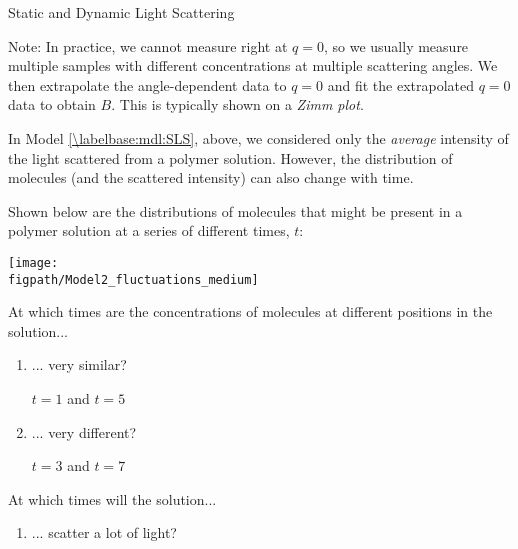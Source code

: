 \begin{activity}{Static and Dynamic Light Scattering}
\begin{ctqs}
\begin{solution}[1.5in]{}
			Note: In practice, we cannot measure right at $q=0$, so we usually measure multiple samples with different concentrations at multiple scattering angles. We then extrapolate the angle-dependent data to $q=0$ and fit the extrapolated $q=0$ data to obtain $B$.  This is typically shown on a \textit{Zimm plot}.
		\end{solution}
		
\end{ctqs}


\begin{model}
	\label{\labelbase:mdl:DLS}
	
	In Model \ref{\labelbase:mdl:SLS}, above, we considered only the \emph{average} intensity of the light scattered from a polymer solution.   However, the distribution of molecules (and the scattered intensity) can also change with time.
	
	Shown below are the distributions of molecules that might be present in a polymer solution at a series of different times, $t$:
	
	\vspace{6pt}
	\centerline{\texttt{[image: \\figpath/Model2\_fluctuations\_medium]}}
	
\end{model}

\begin{ctqs}

	\question At which times are the concentrations of molecules at different positions in the solution...
	
		\begin{enumerate}
			\item ... very similar?
			
				\begin{solution}[0.25in]{}
					$t=1$ and $t=5$
				\end{solution}
			
			\item ... very different?
			
				\begin{solution}[0.25in]{}
					$t=3$ and $t=7$
				\end{solution}
		\end{enumerate}
		
	\question At which times will the solution...
	
		\begin{enumerate}
			\item ... scatter a lot of light?
			

\end{enumerate}
\end{ctqs}
\end{activity}
